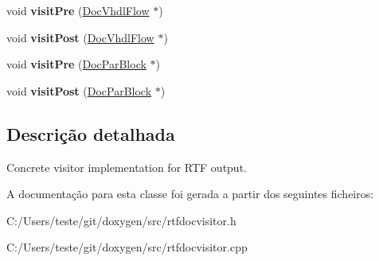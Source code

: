 \begin{DoxyCompactItemize}
\item 
\hypertarget{class_r_t_f_doc_visitor_ab7c53055027c60e0a3a9f4f93e9c3d85}{void {\bfseries visit\-Pre} (\hyperlink{class_doc_vhdl_flow}{Doc\-Vhdl\-Flow} $\ast$)}\label{class_r_t_f_doc_visitor_ab7c53055027c60e0a3a9f4f93e9c3d85}

\item 
\hypertarget{class_r_t_f_doc_visitor_a79febe42f6e032c27aad9a418f979eca}{void {\bfseries visit\-Post} (\hyperlink{class_doc_vhdl_flow}{Doc\-Vhdl\-Flow} $\ast$)}\label{class_r_t_f_doc_visitor_a79febe42f6e032c27aad9a418f979eca}

\item 
\hypertarget{class_r_t_f_doc_visitor_acc4035c695184dd01a26145a88c1a588}{void {\bfseries visit\-Pre} (\hyperlink{class_doc_par_block}{Doc\-Par\-Block} $\ast$)}\label{class_r_t_f_doc_visitor_acc4035c695184dd01a26145a88c1a588}

\item 
\hypertarget{class_r_t_f_doc_visitor_a4bd3a84f45e2f6dc6420638ee8e4ee27}{void {\bfseries visit\-Post} (\hyperlink{class_doc_par_block}{Doc\-Par\-Block} $\ast$)}\label{class_r_t_f_doc_visitor_a4bd3a84f45e2f6dc6420638ee8e4ee27}

\end{DoxyCompactItemize}


\subsection{Descrição detalhada}
Concrete visitor implementation for R\-T\-F output. 

A documentação para esta classe foi gerada a partir dos seguintes ficheiros\-:\begin{DoxyCompactItemize}
\item 
C\-:/\-Users/teste/git/doxygen/src/rtfdocvisitor.\-h\item 
C\-:/\-Users/teste/git/doxygen/src/rtfdocvisitor.\-cpp\end{DoxyCompactItemize}
